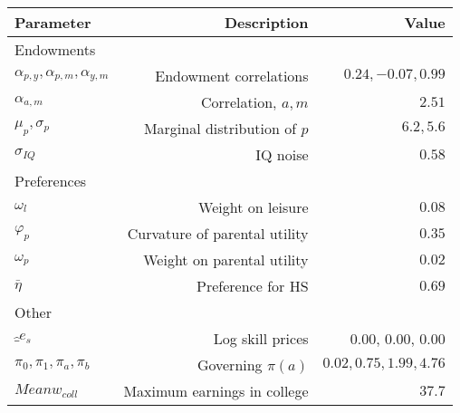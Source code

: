 \begin{tabular}{lrr}
\hline
Parameter & Description  & Value  \\
\hline
Endowments &   &   \\
$\alpha_{p,y}, \alpha_{p,m}, \alpha_{y,m}$ & Endowment correlations  & $0.24, -0.07, 0.99$  \\
$\alpha_{a,m}$ & Correlation, $a,m$  & $2.51$  \\
$\mu_{p}, \sigma_{p}$ & Marginal distribution of $p$  & $6.2, 5.6$  \\
$\sigma_{IQ}$ & IQ noise  & $0.58$  \\
Preferences &   &   \\
$\omega_{l}$ & Weight on leisure  & $0.08$  \\
$\varphi_{p}$ & Curvature of parental utility  & $0.35$  \\
$\omega_{p}$ & Weight on parental utility  & $0.02$  \\
$\bar{\eta}$ & Preference for HS  & $0.69$  \\
Other &   &   \\
$\hat_{e}_{s}$ & Log skill prices  & 0.00, 0.00, 0.00  \\
$\pi_{0}, \pi_{1}, \pi_{a}, \pi_{b}$ & Governing $\pi(a)$  & $0.02, 0.75, 1.99, 4.76$  \\
$Mean w_{coll}$ & Maximum earnings in college  & $37.7$  \\
\hline
\end{tabular}%
